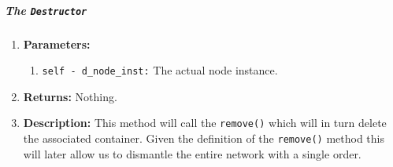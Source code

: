         \subparagraph{The \texttt{Destructor}}
            \begin{enumerate}
                \item \textbf{Parameters:}
                \begin{enumerate}
                    \item \texttt{self - d\_node\_inst:} The actual node instance.
                \end{enumerate}
                \item \textbf{Returns:} Nothing.
                \item \textbf{Description:} This method will call the \texttt{remove()} which will in turn delete the associated container. Given the definition of the \texttt{remove()} method this will later allow us to dismantle the entire network with a single order.
            \end{enumerate}